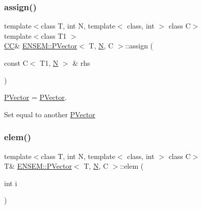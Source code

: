 \subsubsection{\texorpdfstring{assign()}{assign()}\hspace{0.1cm}{\footnotesize\ttfamily [6/6]}}
{\footnotesize\ttfamily template$<$class T, int N, template$<$ class, int $>$ class C$>$ \\
template$<$class T1 $>$ \\
\mbox{\hyperlink{classENSEM_1_1PVector_a92dc0a0a301a3dc96f7be5d337019bc7}{CC}}\& \mbox{\hyperlink{classENSEM_1_1PVector}{E\+N\+S\+E\+M\+::\+P\+Vector}}$<$ T, \mbox{\hyperlink{adat__devel_2lib_2hadron_2operator__name__util_8cc_a7722c8ecbb62d99aee7ce68b1752f337}{N}}, C $>$\+::assign (\begin{DoxyParamCaption}\item[{const C$<$ T1, \mbox{\hyperlink{adat__devel_2lib_2hadron_2operator__name__util_8cc_a7722c8ecbb62d99aee7ce68b1752f337}{N}} $>$ \&}]{rhs }\end{DoxyParamCaption})\hspace{0.3cm}{\ttfamily [inline]}}



\mbox{\hyperlink{classENSEM_1_1PVector}{P\+Vector}} = \mbox{\hyperlink{classENSEM_1_1PVector}{P\+Vector}}. 

Set equal to another \mbox{\hyperlink{classENSEM_1_1PVector}{P\+Vector}} \mbox{\label{classENSEM_1_1PVector_a9cd0edde5b031651ca54dcbd424cc7d8}} 
\subsubsection{\texorpdfstring{elem()}{elem()}\hspace{0.1cm}{\footnotesize\ttfamily [1/6]}}
{\footnotesize\ttfamily template$<$class T, int N, template$<$ class, int $>$ class C$>$ \\
T\& \mbox{\hyperlink{classENSEM_1_1PVector}{E\+N\+S\+E\+M\+::\+P\+Vector}}$<$ T, \mbox{\hyperlink{adat__devel_2lib_2hadron_2operator__name__util_8cc_a7722c8ecbb62d99aee7ce68b1752f337}{N}}, C $>$\+::elem (\begin{DoxyParamCaption}\item[{int}]{i }\end{DoxyParamCaption})\hspace{0.3cm}{\ttfamily [inline]}}

